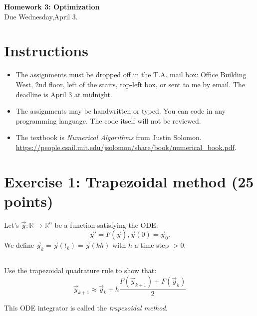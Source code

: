 


\begin{center}
{\large\textbf{Homework 3: Optimization}}\\
Due Wednesday,April 3.
\end{center}

\noindent\makebox[\linewidth]{\rule{\linewidth}{0.6pt}}
 
\section*{Instructions}

\begin{itemize}
\item The assignments must be dropped off in the T.A. mail box: Office Building West, 2nd floor, left of the stairs, top-left box, or sent to me by email. The deadline is April 3 at midnight.
\item The assignments may be handwritten or typed. You can code in any programming language. The code itself will not be reviewed. 
\item The textbook is \emph{Numerical Algorithms} from Justin Solomon.\\ \url{https://people.csail.mit.edu/jsolomon/share/book/numerical_book.pdf}.  
\end{itemize}



\noindent\makebox[\linewidth]{\rule{\linewidth}{0.6pt}}

\section*{Exercise 1: Trapezoidal method \normalsize \textnormal(25 points)}

Let's $\vec{y}: \mathds{R} \rightarrow \mathds{R}^n$ be a function satisfying the ODE:
$$\vec{y}'= F(\vec{y}), \vec{y}(0) = \vec{y}_0.$$
We define $\vec{y}_k = \vec{y}(t_k) = \vec{y}(kh)$ with $h$ a time step $> 0$.

\subsection{} Use the trapezoidal quadrature rule to show that:
$$\vec{y}_{k+1} \approx \vec{y}_k + h\frac{F(\vec{y}_{k+1}) + F(\vec{y}_k)}{2}$$

This ODE integrator is called the \emph{trapezoidal method}.

